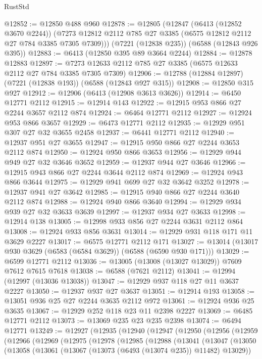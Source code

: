 \begin{lexlean}{RustStd}
\begin{coremodule}
@12852 := @12850 @488 @960
@12878 := @12805
    (@12847
      (@6413 (@12852 @3670 @2244))
      (@7273 @12812 @2112 @785 @27 @3385 (@6575 @12812 @2112 @27 @784 @3385 @7305 @7309)))
    (@7221 (@12838 @235))
    (@6588 (@12843 @926 @395))
@12883 := @6413 (@12850 @395 @89 @3664 @2244)
@12884 := @12878 @12883
@12897 := @7273 @12633 @2112 @785 @27 @3385 (@6575 @12633 @2112 @27 @784 @3385 @7305 @7309)
@12906 := @12788 (@12884 @12897) (@7221 (@12838 @193)) (@6588 (@12843 @927 @315))
@12908 := @12850 @315 @927
@12912 := @12906 (@6413 (@12908 @3613 @3626))
@12914 := @6450 @12771 @2112
@12915 := @12914 @143
@12922 := @12915 @953 @866 @27 @2244 @3657 @2112 @874
@12924 := @6464 @12771 @2112
@12927 := @12924 @953 @866 @3657
@12929 := @6473 @12771 @2112
@12935 := @12929 @951 @307 @27 @32 @3655 @2458
@12937 := @6441 @12771 @2112
@12940 := @12937 @951 @27 @3655
@12947 := @12915 @950 @866 @27 @2244 @3653 @2112 @874
@12950 := @12924 @950 @866 @3653
@12956 := @12929 @944 @949 @27 @32 @3646 @3652
@12959 := @12937 @944 @27 @3646
@12966 := @12915 @943 @866 @27 @2244 @3644 @2112 @874
@12969 := @12924 @943 @866 @3644
@12975 := @12929 @941 @699 @27 @32 @3642 @3252
@12978 := @12937 @941 @27 @3642
@12985 := @12915 @940 @866 @27 @2244 @3640 @2112 @874
@12988 := @12924 @940 @866 @3640
@12994 := @12929 @934 @939 @27 @32 @3633 @3639
@12997 := @12937 @934 @27 @3633
@12998 := @12914 @138
@13005 := @12998 @933 @856 @27 @2244 @3631 @2112 @864
@13008 := @12924 @933 @856 @3631
@13014 := @12929 @931 @118 @171 @11 @3629 @2227
@13017 := @6575 @12771 @2112 @171
@13027 := @13014 (@13017 @930 @3629 (@6583 (@6584 @3629)) (@6588 (@6590 @930 @171)))
@13029 := @6599 @12771 @2112
@13036 := @13005 (@13008 (@13027 @13029)) @7609 @7612 @7615 @7618
@13038 := @6588 (@7621 @2112)
@13041 := @12994 (@12997 (@13036 @13038))
@13047 := @12929 @937 @118 @27 @11 @3637 @2227
@13050 := @12937 @937 @27 @3637
@13051 := @12914 @193
@13058 := @13051 @936 @25 @27 @2244 @3635 @2112 @972
@13061 := @12924 @936 @25 @3635
@13067 := @12929 @252 @118 @23 @11 @2398 @2227
@13069 := @6485 @12771 @2112
@13073 := @13069 @235 @23 @235 @2398
@13074 := @6494 @12771
@13249 := @12927
    (@12935
      (@12940
        (@12947
          (@12950
            (@12956
              (@12959
                (@12966
                  (@12969
                    (@12975
                      (@12978
                        (@12985
                          (@12988
                            (@13041
                              (@13047
                                (@13050
                                  (@13058
                                    (@13061 (@13067 (@13073 (@6493 (@13074 @235)) @11482) @13029))

\end{coremodule}
\end{lexlean}
